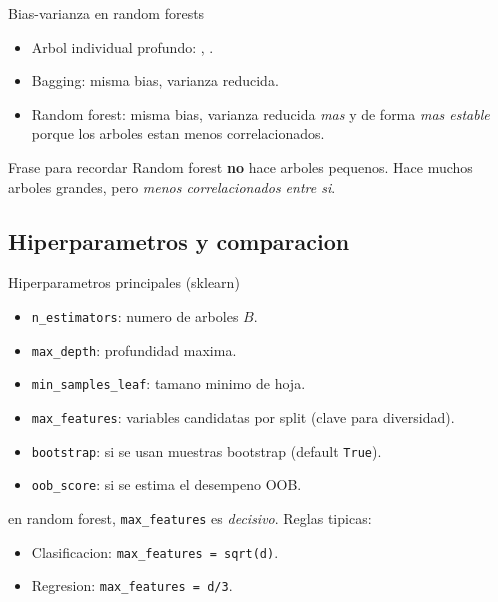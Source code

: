 \begin{frame}{Bias-varianza en random forests}
\begin{itemize}\small
  \item Arbol individual profundo: , .
  \item Bagging: misma bias, varianza reducida.
  \item Random forest: misma bias, varianza reducida \emph{mas} y de forma \emph{mas estable} porque los arboles estan menos correlacionados.
\end{itemize}

\vspace{0.4em}
\begin{block}{Frase para recordar}
\small
Random forest \textbf{no} hace arboles pequenos. Hace muchos arboles grandes, pero \emph{menos correlacionados entre si}.
\end{block}
\end{frame}

\subsection{Hiperparametros y comparacion}

\begin{frame}{Hiperparametros principales (sklearn)}
\begin{itemize}\small
  \item \texttt{n\_estimators}: numero de arboles $B$.
  \item \texttt{max\_depth}: profundidad maxima.
  \item \texttt{min\_samples\_leaf}: tamano minimo de hoja.
  \item \texttt{max\_features}: variables candidatas por split (clave para diversidad).
  \item \texttt{bootstrap}: si se usan muestras bootstrap (default \texttt{True}).
  \item \texttt{oob\_score}: si se estima el desempeno OOB.
\end{itemize}

\vspace{0.3em}
 en random forest, \texttt{max\_features} es \emph{decisivo}. Reglas tipicas:
\begin{itemize}\footnotesize
  \item Clasificacion: \texttt{max\_features = sqrt(d)}.
  \item Regresion: \texttt{max\_features = d/3}.
\end{itemize}
\end{frame}

